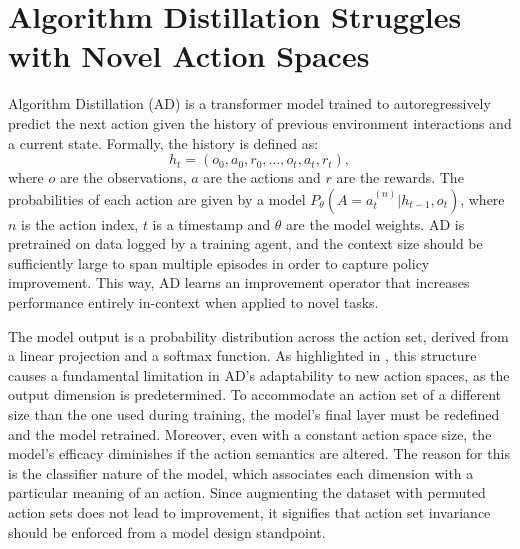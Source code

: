 \section{Algorithm Distillation Struggles with Novel Action Spaces}
\label{section:ad_struggles}

Algorithm Distillation (AD) \citep{laskin2022context} is a transformer model trained to autoregressively predict the next action given the history of previous environment interactions and a current state. Formally, the history is defined as:
\[
h_t = \left(o_0, a_0, r_0, \dots, o_t, a_t, r_t\right),
\]
where $o$ are the observations, $a$ are the actions and $r$ are the rewards. The probabilities of each action are given by a model $P_\theta(A=a^{(n)}_t|h_{t-1}, o_t)$, where $n$ is the action index, $t$ is a timestamp and $\theta$ are the model weights. 
AD is pretrained on data logged by a training agent, and the context size should be sufficiently large to span multiple episodes in order to capture policy improvement. This way, AD learns an improvement operator that increases performance entirely in-context when applied to novel tasks.

The model output is a probability distribution across the action set, derived from a linear projection and a softmax function. As highlighted in , this structure causes a fundamental limitation in AD's adaptability to new action spaces, as the output dimension is predetermined. To accommodate an action set of a different size than the one used during training, the model's final layer must be redefined and the model retrained. Moreover, even with a constant action space size, the model's efficacy diminishes if the action semantics are altered. The reason for this is the classifier nature of the model, which associates each dimension with a particular meaning of an action. Since augmenting the dataset with permuted action sets does not lead to improvement, it signifies that action set invariance should be enforced from a model design standpoint.